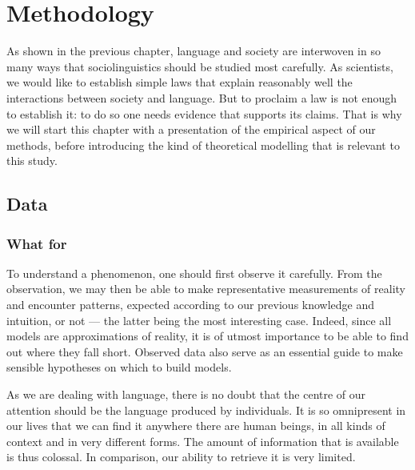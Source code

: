 \documentclass[../thesis.tex]{subfiles}
\begin{document}
\chapter{Methodology}
\label{ch:methods}

As shown in the previous chapter, language and society are interwoven in so many ways
that sociolinguistics should be studied most carefully. As scientists, we would like to
establish simple laws that explain reasonably well the interactions between society and
language. But to proclaim a law is not enough to establish it: to do so one needs
evidence that supports its claims. That is why we will start this chapter with a
presentation of the empirical aspect of our methods, before introducing the kind of
theoretical modelling that is relevant to this study.



\section{Data}
\subsection{What for}
To understand a phenomenon, one should first observe it carefully. From the observation,
we may then be able to make representative measurements of reality and encounter
patterns, expected according to our previous knowledge and intuition, or not --- the
latter being the most interesting case. Indeed, since all models are approximations of
reality, it is of utmost importance to be able to find out where they fall short.
Observed data also serve as an essential guide to make sensible hypotheses on which to
build models.

As we are dealing with language, there is no doubt that the centre of our attention
should be the language produced by individuals. It is so omnipresent in our lives that
we can find it anywhere there are human beings, in all kinds of context and in very
different forms. The amount of information that is available is thus colossal. In
comparison, our ability to retrieve it is very limited.
\end{document}
